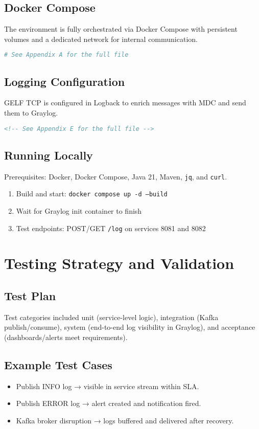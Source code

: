 \documentclass[12pt,a4paper]{report}
\begin{document}
\section{Docker Compose}
The environment is fully orchestrated via Docker Compose with persistent volumes and a dedicated network for internal communication.

\begin{lstlisting}[language=YAML,caption={docker-compose.yml overview},label={lst:compose}]
# See Appendix A for the full file
\end{lstlisting}

\section{Logging Configuration}
GELF TCP is configured in Logback to enrich messages with MDC and send them to Graylog.

\begin{lstlisting}[language=XML,caption={Logback GELF appender (log-service)},label={lst:logback}]
<!-- See Appendix E for the full file -->
\end{lstlisting}

\section{Running Locally}
Prerequisites: Docker, Docker Compose, Java 21, Maven, \texttt{jq}, and \texttt{curl}.
\begin{enumerate}
  \item Build and start: \texttt{docker compose up -d --build}
  \item Wait for Graylog init container to finish
  \item Test endpoints: POST/GET \texttt{/log} on services 8081 and 8082
\end{enumerate}

\chapter{Testing Strategy and Validation}
\section{Test Plan}
Test categories included unit (service-level logic), integration (Kafka publish/consume), system (end-to-end log visibility in Graylog), and acceptance (dashboards/alerts meet requirements).

\section{Example Test Cases}
\begin{itemize}[leftmargin=1.2cm]
  \item Publish INFO log → visible in service stream within SLA.
  \item Publish ERROR log → alert created and notification fired.
  \item Kafka broker disruption → logs buffered and delivered after recovery.
\end{itemize}
\end{document}
